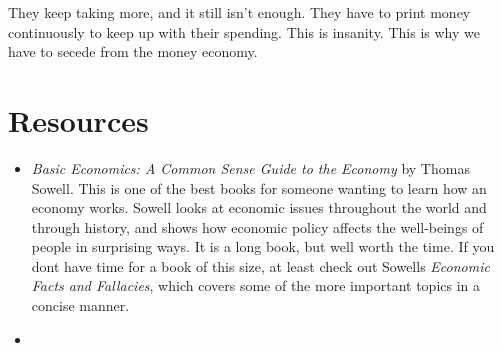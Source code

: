\documentclass[letterpaper]{article}
\begin{document}
{\color{black}
They keep taking more, and it still isn’t enough. They have to print
money \textcolor[rgb]{0.32941177,0.5529412,0.83137256}{continuously }to
keep up with their spending. This is insanity. This is why we have to
secede from the money economy.}

\section{Resources}
\begin{itemize}
\item {\color{black}
\textit{Basic Economics: A Common Sense Guide to the Economy} by Thomas
Sowell.  This is one of the best books for someone wanting to learn how
an economy works.  Sowell looks at economic issues throughout the world
and through history, and shows how economic policy affects the
well-beings of people in surprising ways.  It is a long book, but well
worth the time.  If you don{\textquotesingle}t have time for a book of
this size, at least check out Sowell{\textquotesingle}s
\textit{Economic Facts and Fallacies}, which covers some of the more
important topics in a concise manner.}
\item 
\bigskip
\end{itemize}
\end{document}
